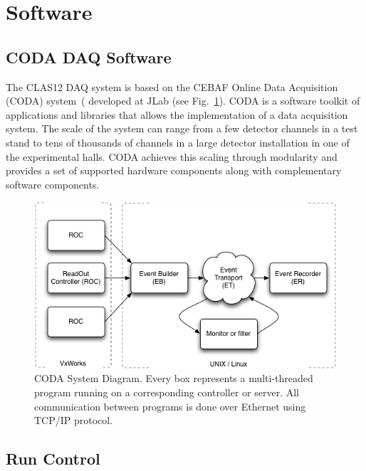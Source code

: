 \section{Software}

\subsection{CODA DAQ Software}

The CLAS12 DAQ system is based on the CEBAF Online Data Acquisition (CODA) system~(\cite{coda-ref} developed
at JLab (see Fig.~\ref{fig:coda_diagram}). CODA is a software toolkit of applications and libraries that allows the
implementation of a data acquisition system. The scale of the system can range from a few detector channels in a test
stand to tens of thousands of channels in a large detector installation in one of the experimental halls. CODA achieves
this scaling through modularity and provides a set of supported hardware components along with complementary software
components.

\begin{figure}[hbt]
	\centering
	\includegraphics[width=1.0\columnwidth,keepaspectratio]{img/coda_diagram.png}
	\caption{CODA System Diagram. Every box represents a multi-threaded program running on a corresponding
          controller or server. All communication between programs is done over Ethernet using TCP/IP protocol.}
	\label{fig:coda_diagram}
\end{figure}

\subsection {Run Control}


